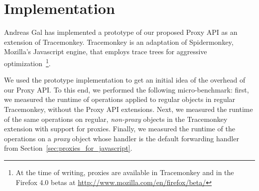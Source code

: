 \documentclass{sig-alternate}
\begin{document}




\section{Implementation}
\label{sub:benchmarks}

Andreas Gal has implemented a prototype of our proposed Proxy API as an extension of Tracemonkey. Tracemonkey is an adaptation of Spidermonkey, Mozilla's Javascript engine, that employs trace trees for aggressive optimization~\cite{gal06efficient}\footnote{At the time of writing, proxies are available in Tracemonkey and in the Firefox 4.0 betas at \url{http://www.mozilla.com/en/firefox/beta/}}.

We used the prototype implementation to get an initial idea of the overhead of our Proxy API. To this end, we performed the following micro-benchmark: first, we measured the runtime of operations applied to regular objects in regular Tracemonkey, without the Proxy API extensions. Next, we measured the runtime of the same operations on regular, \emph{non-proxy} objects in the Tracemonkey extension with support for proxies. Finally, we measured the runtime of the operations on a \emph{proxy} object whose handler is the default forwarding handler from Section~\ref{sec:proxies_for_javascript}.
\end{document}
